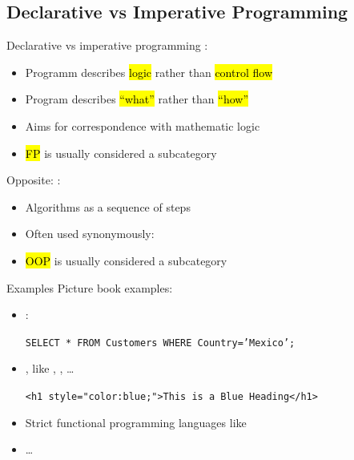 \subsection[Declarative vs Imperative]{Declarative vs Imperative Programming}


\begin{frame}{Declarative vs imperative programming}
	:
	\begin{itemize}
		\item Programm describes \hl{logic} rather than \hl{control flow}
		\item Program describes \hl{\enquote{what}} rather than \hl{\enquote{how}}
		\item Aims for correspondence with mathematic logic
		\item \hl{FP} is usually considered a subcategory
	\end{itemize}
	
	\medskip
	Opposite: :
	\begin{itemize}
		\item Algorithms as a sequence of steps
		\item Often used synonymously:  
		\item \hl{OOP} is usually considered a subcategory
	\end{itemize}
\end{frame}

\begin{frame}{Examples}
	Picture book examples:
	\begin{itemize}
		\item {} :
		\begin{center}
			\texttt{SELECT * FROM Customers WHERE Country='Mexico';}
		\end{center}
		\item {}, like ,  , \dots
		\begin{center}
			\texttt{<h1 style="color:blue;">This is a Blue Heading</h1>
			}
		\end{center}
		\item Strict functional programming languages like 
		\item \dots
\end{itemize}
\end{frame}

